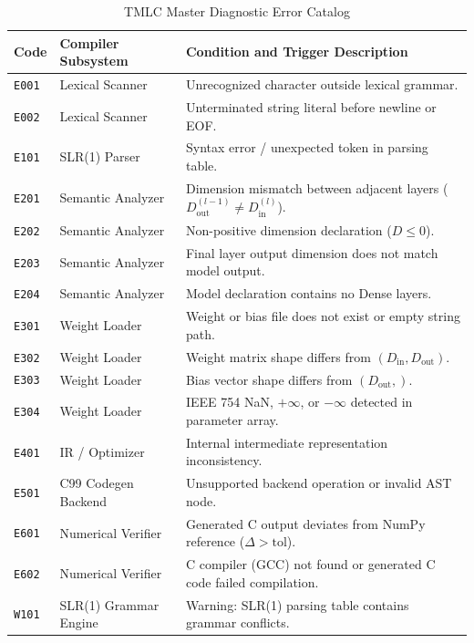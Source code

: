 \documentclass[11pt,a4paper]{article}
\begin{document}
\begin{table}[htbp]
\centering
\small
\caption{TMLC Master Diagnostic Error Catalog}
\label{tab:error_taxonomy}
\begin{tabular}{llp{9.2cm}}
\toprule
\textbf{Code} & \textbf{Compiler Subsystem} & \textbf{Condition and Trigger Description} \\
\midrule
\texttt{E001} & Lexical Scanner            & Unrecognized character outside lexical grammar. \\
\texttt{E002} & Lexical Scanner            & Unterminated string literal before newline or EOF. \\
\texttt{E101} & SLR(1) Parser              & Syntax error / unexpected token in parsing table. \\
\texttt{E201} & Semantic Analyzer          & Dimension mismatch between adjacent layers ($D_{\text{out}}^{(l-1)} \neq D_{\text{in}}^{(l)}$). \\
\texttt{E202} & Semantic Analyzer          & Non-positive dimension declaration ($D \le 0$). \\
\texttt{E203} & Semantic Analyzer          & Final layer output dimension does not match model output. \\
\texttt{E204} & Semantic Analyzer          & Model declaration contains no Dense layers. \\
\texttt{E301} & Weight Loader              & Weight or bias file does not exist or empty string path. \\
\texttt{E302} & Weight Loader              & Weight matrix shape differs from $(D_{\text{in}}, D_{\text{out}})$. \\
\texttt{E303} & Weight Loader              & Bias vector shape differs from $(D_{\text{out}},)$. \\
\texttt{E304} & Weight Loader              & IEEE 754 NaN, $+\infty$, or $-\infty$ detected in parameter array. \\
\texttt{E401} & IR / Optimizer             & Internal intermediate representation inconsistency. \\
\texttt{E501} & C99 Codegen Backend        & Unsupported backend operation or invalid AST node. \\
\texttt{E601} & Numerical Verifier         & Generated C output deviates from NumPy reference ($\Delta > \text{tol}$). \\
\texttt{E602} & Numerical Verifier         & C compiler (GCC) not found or generated C code failed compilation. \\
\texttt{W101} & SLR(1) Grammar Engine      & Warning: SLR(1) parsing table contains grammar conflicts. \\
\bottomrule
\end{tabular}
\end{table}
\end{document}

